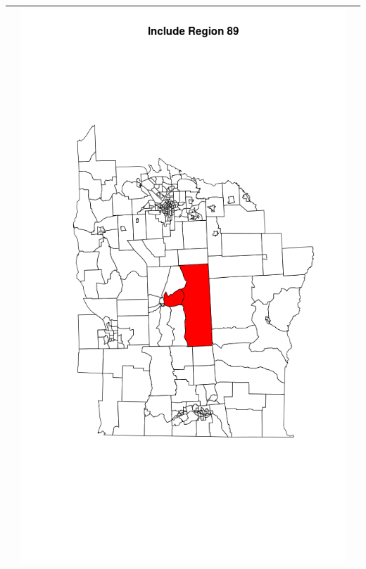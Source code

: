 \documentclass[12pt]{article}
\begin{document}
\begin{tabular}{|c|c|c|}
					&\includegraphics[scale=0.2]{ny89.png} \\ \hline

\end{tabular}
\end{document}
